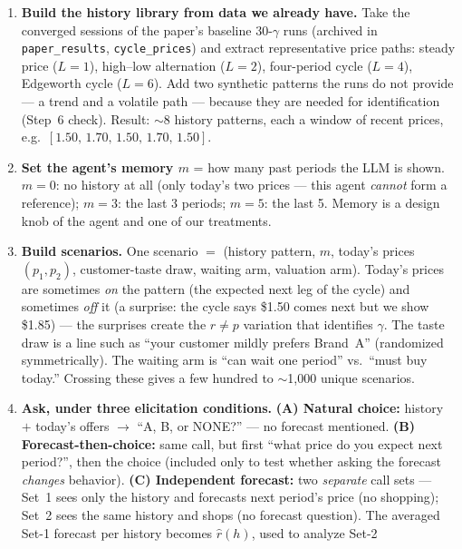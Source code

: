 \documentclass[11pt]{article}
\begin{document}
\begin{enumerate}[label=\textbf{Step \arabic*.},leftmargin=2.1cm]
  \item \textbf{Build the history library from data we already have.} Take the converged sessions of the
        paper's baseline 30-$\gamma$ runs (archived in \texttt{paper\_results}, \texttt{cycle\_prices}) and
        extract representative price paths: steady price ($L{=}1$), high--low alternation ($L{=}2$),
        four-period cycle ($L{=}4$), Edgeworth cycle ($L{=}6$). Add two synthetic patterns the runs do not
        provide --- a trend and a volatile path --- because they are needed for identification (Step~6
        check). Result: $\sim$8 history patterns, each a window of recent prices, e.g.\
        $[1.50,\,1.70,\,1.50,\,1.70,\,1.50]$.
  \item \textbf{Set the agent's memory $m$} = how many past periods the LLM is shown. $m{=}0$: no history
        at all (only today's two prices --- this agent \emph{cannot} form a reference); $m{=}3$: the last 3
        periods; $m{=}5$: the last 5. Memory is a design knob of the agent and one of our treatments.
  \item \textbf{Build scenarios.} One scenario $=$ (history pattern, $m$, today's prices $(p_1,p_2)$,
        customer-taste draw, waiting arm, valuation arm). Today's prices are sometimes \emph{on} the
        pattern (the expected next leg of the cycle) and sometimes \emph{off} it (a surprise: the cycle
        says \$1.50 comes next but we show \$1.85) --- the surprises create the $r\neq p$ variation that
        identifies $\gamma$. The taste draw is a line such as ``your customer mildly prefers Brand~A''
        (randomized symmetrically). The waiting arm is ``can wait one period'' vs.\ ``must buy today.''
        Crossing these gives a few hundred to $\sim$1{,}000 unique scenarios.
  \item \textbf{Ask, under three elicitation conditions.}
        \textbf{(A) Natural choice:} history $+$ today's offers $\to$ ``A, B, or NONE?'' --- no forecast
        mentioned.
        \textbf{(B) Forecast-then-choice:} same call, but first ``what price do you expect next period?'',
        then the choice (included only to test whether asking the forecast \emph{changes} behavior).
        \textbf{(C) Independent forecast:} two \emph{separate} call sets --- Set~1 sees only the history and
        forecasts next period's price (no shopping); Set~2 sees the same history and shops (no forecast
        question). The averaged Set-1 forecast per history becomes $\hat r(h)$, used to analyze Set-2

\end{enumerate}
\end{document}
